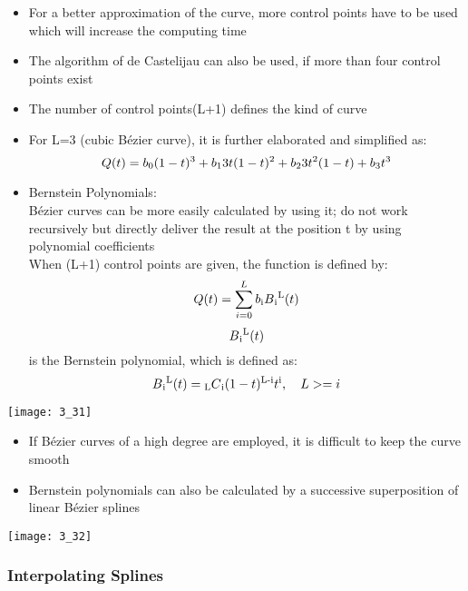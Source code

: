 \documentclass{standalone}
\begin{document}
\begin{itemize}
	\begin{itemize}
		\item For a better approximation of the curve, more control points have to be used which will increase the computing time
		\item The algorithm of de Castelijau can also be used, if more than four control points exist
		\item The number of control points(L+1) defines the kind of curve
		\item For L=3 (cubic B\'ezier curve), it is further elaborated and simplified as:
		\begin{equation}
			Q(t) = b\textsubscript{0}(1-t)\textsuperscript{3}+b\textsubscript{1}3t(1-t)\textsuperscript{2}+b\textsubscript{2}3t\textsuperscript{2}(1-t)+b\textsubscript{3}t\textsuperscript{3}
		\end{equation}
		\item Bernstein Polynomials: \\
		B\'ezier curves can be more easily calculated by using it; do not work recursively but directly deliver the result at the position t by using polynomial coefficients \\
		When (L+1) control points are given, the function is defined by:
		\begin{equation}
			Q(t) = \sum_{i=0}^Lb\textsubscript{i} B\textsubscript{i}\textsuperscript{L}(t)
		\end{equation}
		$$ B\textsubscript{i}\textsuperscript{L}(t) $$ is the Bernstein polynomial, which is defined as:
		\begin{equation}
			B\textsubscript{i}\textsuperscript{L}(t)= \textsubscript{L}C\textsubscript{i} (1-t)\textsuperscript{L-i}t\textsuperscript{i}, \quad L >=i
		\end{equation}
	\end{itemize}
	\texttt{[image: 3\_31]}
	\begin{itemize}
		\item If B\'ezier curves of a high degree are employed, it is difficult to keep the curve smooth
		\item Bernstein polynomials can also be calculated by a successive superposition of linear B\'ezier splines
	\end{itemize}
	\texttt{[image: 3\_32]}
\end{itemize}

\subsubsection*{Interpolating Splines}
\end{document}
